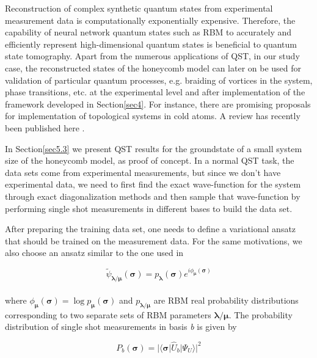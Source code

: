 \documentclass{article}
\begin{document}
Reconstruction of complex synthetic quantum states from experimental measurement data is computationally exponentially expensive. Therefore, the capability of neural network quantum states such as RBM to accurately and efficiently represent high-dimensional quantum states is beneficial to quantum state tomography. Apart from the numerous applications of QST, in our study case, the reconstructed states of the honeycomb model can later on be used for validation of particular quantum processes, e.g. braiding of vortices in the system, phase transitions, etc. at the experimental level and after implementation of the framework developed in Section\hspace{0.2mm}\ref{sec4}. For instance, there are promising proposals for implementation of topological systems in cold atoms. A review has recently been published here \cite{coldatom}. 

In Section\hspace{0.2mm}\ref{sec5.3} we present QST results for the groundstate of a small system size of the honeycomb model, as proof of concept. In a normal QST task, the data sets come from experimental measurements, but since we don't have experimental data, we need to first find the exact wave-function for the system through exact diagonalization methods and then sample that wave-function by performing single shot measurements in different bases to build the data set. 

After preparing the training data set, one needs to define a variational ansatz that should be trained on the measurement data. For the same motivations, we also choose an ansatz similar to the one used in \cite{Torlai_2018}

\begin{equation}\label{eq:19_2}
        \tilde \psi_{\boldsymbol{\lambda/\mu}} (\boldsymbol{\sigma})  =  p_{\boldsymbol{\lambda}}(\boldsymbol{\sigma}) e^{i \phi_{\boldsymbol{\mu}}(\boldsymbol{\sigma})}
\end{equation}\\

where $\phi_{\boldsymbol{\mu}}(\boldsymbol{\sigma}) = \log p_{\boldsymbol{\mu}}(\boldsymbol{\sigma})$ and $p_{\boldsymbol{\lambda/\mu}}$ are RBM real probability distributions corresponding to two separate sets of RBM parameters $\boldsymbol{\lambda/\mu}$. The probability distribution of single shot measurements in basis \textit{b} is given by 

\begin{equation}\label{eq:19_3}
        P_{b}(\boldsymbol{\sigma}) = | \langle \boldsymbol{\sigma}| \hat{U}_{b} |\Psi_{U}\rangle|^{2}
\end{equation}\\
\end{document}
